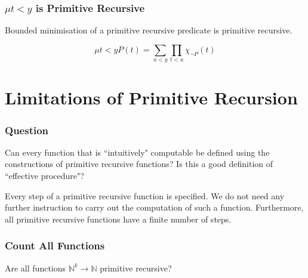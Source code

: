 \documentclass{beamer}
\begin{document}
\begin{frame}
	\frametitle{$\mu t < y$ is Primitive Recursive}

	Bounded minimisation of a primitive recursive predicate is primitive recursive. 

	$$\mu t < y P(t) = \sum_{u < y}\prod_{t < u}\chi_{\lnot P}(t) $$

	\vspace{7cm}
	

\end{frame}

\section{Limitations of Primitive Recursion}

\begin{frame}
  \frametitle{Question}

	Can every function that is ``intuitively" computable be defined using the constructions of primitive recursive functions? Is this a good definition of ``effective procedure"? 

	\vspace{0.5cm}

	Every step of a primitive recursive function is specified. We do not need any further instruction to carry out the computation of such a function. Furthermore, all primitive recursive functions have a finite number of steps. 

	\vspace{0.5cm}


\end{frame}

\begin{frame}
	\frametitle{Count All Functions}

	Are all functions $\mathbb{N}^{k} \rightarrow \mathbb{N}$ primitive recursive? 
	\vspace{7cm}

\end{frame}
\end{document}
